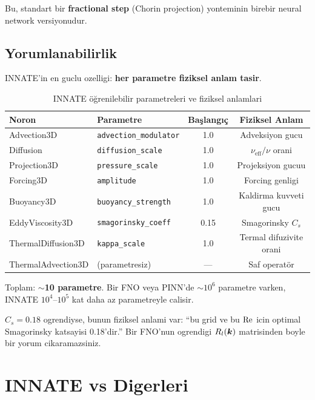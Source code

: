 Bu, standart bir \textbf{fractional step} (Chorin projection) yonteminin birebir neural network versiyonudur.

\subsection{Yorumlanabilirlik}

INNATE'in en guclu ozelligi: \textbf{her parametre fiziksel anlam tasir}.

\begin{table}[H]
\centering
\caption{INNATE öğrenilebilir parametreleri ve fiziksel anlamlari}
\label{tab:innate_params}
\begin{tabular}{llcc}
\toprule
\textbf{Noron} & \textbf{Parametre} & \textbf{Başlangıç} & \textbf{Fiziksel Anlam} \\
\midrule
Advection3D & \texttt{advection\_modulator} & 1.0 & Adveksiyon gucu \\
Diffusion & \texttt{diffusion\_scale} & 1.0 & $\nu_{\text{eff}}/\nu$ orani \\
Projection3D & \texttt{pressure\_scale} & 1.0 & Projeksiyon gucuu \\
Forcing3D & \texttt{amplitude} & 1.0 & Forcing genligi \\
Buoyancy3D & \texttt{buoyancy\_strength} & 1.0 & Kaldirma kuvveti gucu \\
EddyViscosity3D & \texttt{smagorinsky\_coeff} & 0.15 & Smagorinsky $C_s$ \\
ThermalDiffusion3D & \texttt{kappa\_scale} & 1.0 & Termal difuzivite orani \\
ThermalAdvection3D & (parametresiz) & --- & Saf operatör \\
\bottomrule
\end{tabular}
\end{table}

Toplam: \textbf{$\sim$10 parametre}. Bir FNO veya PINN'de $\sim10^6$ parametre varken, INNATE $10^4$--$10^5$ kat daha az parametreyle calisir.

\begin{remark}
$C_s = 0.18$ ogrendiyse, bunun fiziksel anlami var: ``bu grid ve bu $\mathrm{Re}$ icin optimal Smagorinsky katsayisi 0.18'dir.'' Bir FNO'nun ogrendigi $R_l(\bm{k})$ matrisinden boyle bir yorum cikaramazsiniz.
\end{remark}


\section{INNATE vs Digerleri}
\label{sec:comparison}

